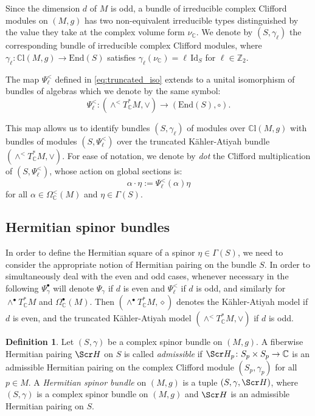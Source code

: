 \documentclass[10pt,a4paper,twoside,reqno]{amsart}
\theoremstyle{plain}
\theoremstyle{definition}
\newtheorem{definition}[thm]{Definition}
\theoremstyle{remark}
\newcommand{\End}{\mathrm{End}}
\def\Z{\mathbb{Z}}
\def\C{\mathbb{C}}
\def\Id{\mathrm{Id}}
\def\scS{\Scr H}
\def\mCl{\mathbb{C}\mathrm{l}}
\begin{document}
Since the dimension $d$ of $M$ is odd, a bundle of irreducible complex Clifford modules on $(M,g)$ has two non-equivalent irreducible types distinguished by the value they take at the complex volume form $\nu_\C$. We denote by $(S,\gamma_\ell)$ the corresponding bundle of irreducible complex Clifford modules, where $\gamma_\ell\colon\mCl(M,g)\to\End(S)$ satisfies $\gamma_\ell(\nu_\C)=\ell\,\Id_S$ for $\ell\in\Z_2$.\medskip

The map $\Psi^<_\ell$ defined in \eqref{eq:truncated_iso} extends to a unital isomorphism of bundles of algebras which we denote by the same symbol: $$\Psi^<_\ell\colon(\wedge^<T^*_\C M,\vee)\to(\End(S),\circ).$$

This map allows us to identify bundles $(S,\gamma_\ell)$ of modules over $\mCl(M,g)$ with bundles of modules $(S,\Psi^<_\ell)$ over the truncated Kähler-Atiyah bundle $(\wedge^<T^*_\C M,\vee)$. For ease of notation, we denote by \emph{dot} the Clifford multiplication of $(S,\Psi^<_\ell)$, whose action on global sections is: $$\alpha\cdot\eta:=\Psi^<_\ell(\alpha)\eta$$ for all $\alpha\in\Omega^<_\C(M)$ and $\eta\in\Gamma(S)$.


\subsection{Hermitian spinor bundles}


In order to define the Hermitian square of a spinor $\eta\in\Gamma(S)$, we need to consider the appropriate notion of Hermitian pairing on the bundle $S$. In order to simultaneously deal with the even and odd cases, whenever necessary in the following $\Psi^{\bullet}_{\gamma}$ will denote $\Psi_{\gamma}$ if $d$ is even and $\Psi^{<}_{\ell}$ if $d$ is odd, and similarly for $\wedge^{\bullet}T^*_\C M$ and $\Omega^{\bullet}_{\mathbb{C}}(M)$. Then $(\wedge^{\bullet}T^*_\C M,\diamond)$ denotes the Kähler-Atiyah model if $d$ is even, and the truncated Kähler-Atiyah model $(\wedge^<T^*_\C M,\vee)$ if $d$ is odd.

\begin{definition}
Let $(S,\gamma)$ be a complex spinor bundle on $(M,g)$. A fiberwise Hermitian pairing $\scS$ on $S$ is called \emph{admissible} if $\scS_p\colon S_p\times S_p\to\C$ is an admissible Hermitian pairing on the complex Clifford module $(S_p,\gamma_p)$ for all $p\in M$. A \emph{Hermitian spinor bundle} on $(M,g)$ is a tuple $(S,\gamma,\scS)$, where $(S,\gamma)$ is a complex spinor bundle on $(M,g)$ and $\scS$ is an admissible Hermitian pairing on $S$.
\end{definition}
\end{document}
